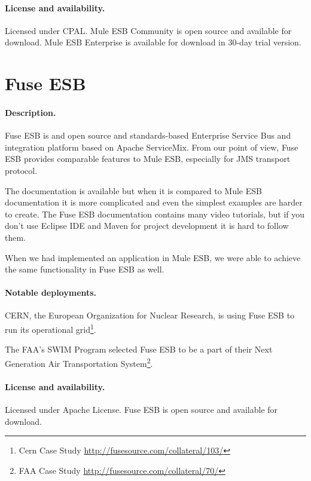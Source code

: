 \documentclass[a4paper]{report}
\begin{document}
\paragraph{License and availability.}
Licensed under CPAL. Mule ESB Community is open source and available for download. Mule ESB Enterprise is available for download in 30-day trial version.



\section{Fuse ESB}

\paragraph{Description.}
Fuse ESB is and open source and standards-based Enterprise Service Bus and integration platform based on Apache ServiceMix. From our point of view, Fuse ESB provides comparable features to Mule ESB, especially for JMS transport protocol.

The documentation is available but when it is compared to Mule ESB documentation it is more complicated and even the simplest examples are harder to create. The Fuse ESB documentation contains many video tutorials, but if you don't use Eclipse IDE and Maven for project development it is hard to follow them.

When we had implemented an application in Mule ESB, we were able to achieve the same functionality in Fuse ESB as well.

\paragraph{Notable deployments.}
\begin{compactitem}
\item  CERN, the European Organization for Nuclear Research, is using Fuse ESB to run its operational grid\footnote{Cern Case Study \url{http://fusesource.com/collateral/103/}}.
\item The FAA’s SWIM Program selected Fuse ESB to be a part of their Next Generation Air Transportation System\footnote{FAA Case Study \url{http://fusesource.com/collateral/70/}}.
\end{compactitem} 

\paragraph{License and availability.}
Licensed under Apache License. Fuse ESB is open source and available for download.
\end{document}
